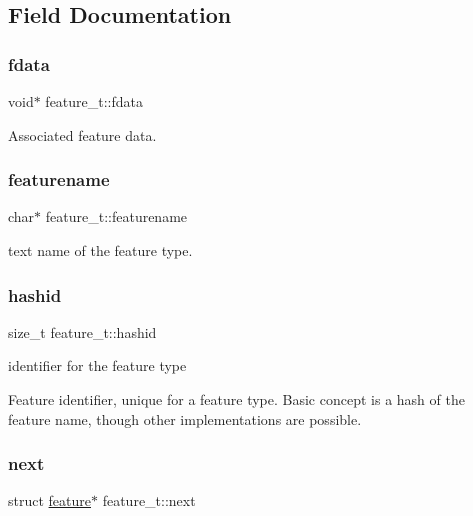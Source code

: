 \subsection{Field Documentation}
\mbox{\label{structfeature__t_a363d3009c71db9c2294f5227ce186649}} 
\subsubsection{\texorpdfstring{fdata}{fdata}}
{\footnotesize\ttfamily void$\ast$ feature\+\_\+t\+::fdata}

Associated feature data. \mbox{\label{structfeature__t_a2d4a7e92af0cf4e2bdfc04ec3fb60fb5}} 
\subsubsection{\texorpdfstring{featurename}{featurename}}
{\footnotesize\ttfamily char$\ast$ feature\+\_\+t\+::featurename}



text name of the feature type. 

\mbox{\label{structfeature__t_a9622cb072e66eb7ad9dd21feeaf8991c}} 
\subsubsection{\texorpdfstring{hashid}{hashid}}
{\footnotesize\ttfamily size\+\_\+t feature\+\_\+t\+::hashid}



identifier for the feature type 

Feature identifier, unique for a feature type. Basic concept is a hash of the feature name, though other implementations are possible. \mbox{\label{structfeature__t_a827085f4088e261498adaf6f6c70304e}} 
\subsubsection{\texorpdfstring{next}{next}}
{\footnotesize\ttfamily struct \hyperlink{graphdata_8h_a068417678f021a74e911edd39f8d0bce}{feature}$\ast$ feature\+\_\+t\+::next}


